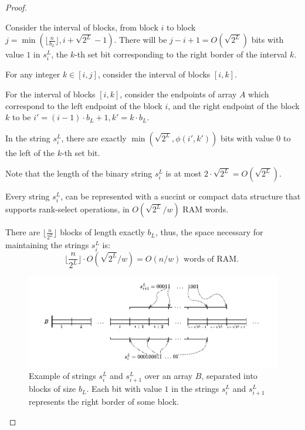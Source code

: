 \documentclass[runningheads]{llncs}
\begin{document}
\begin{proof}
\begin{definition}
        \begin{property}
            Consider the interval of blocks, from block $i$ to block $j=\min( \lfloor \frac{n}{b_L} \rfloor, i+\sqrt{2^L}-1 )$.
            There will be $j-i+1=O(\sqrt{2^L})$ bits with value $1$ in $s_i^L$, the $k$-th set bit corresponding to the right border of the interval $k$.        
        \end{property}

        \begin{property}
            For any integer $k\in [i,j]$, consider the interval of blocks $[i,k]$.

            For the interval of blocks $[i,k]$, consider the endpoints of array $A$ which correspond to the left endpoint of the block $i$, and the right endpoint of the block $k$ 
            to be $i'=(i-1)\cdot b_L+1, k'=k\cdot b_L$.

            In the string $s_i^L$, there are exactly $\min(\sqrt{2^L}, \phi(i',k') )$ bits with value $0$ to the left of the $k$-th set bit. 
        
        \end{property}

    \end{definition}
    
    Note that the length of the binary string $s_i^L$ is at most $ 2\cdot \sqrt{2^L} = O(\sqrt{2^L})$.
    
    Every string $s_i^L$, can be represented with a succint or compact data structure that supports rank-select operations, in $O(\sqrt{2^L}/w)$ RAM words.
    
    There are $\lfloor \frac{n}{2^L} \rfloor$ blocks of length exactly $b_L$, thus, the space necessary for maintaining the strings $s_i^L$ is:
    \[
        \lfloor \frac{n}{2^L} \rfloor \cdot O(\sqrt{2^L}/w) = O(n/w) \text{ words of RAM. }
    \]


    \begin{figure}[H]
        \centering
        \hspace*{-1.2cm}      
        \includegraphics[scale=0.8]{figures/example_figure2.pdf}
        \caption{ Example of strings $s_{i}^{L}$ and $s_{i+1}^{L}$ over an array $B$, separated into blocks of size $b_L$. 
        Each bit with value $1$ in the strings $s_{i}^L$ and $s_{i+1}^L$ represents the right border of some block. }
        \label{fig:fig2}
    \end{figure}



\end{proof}
\end{document}
